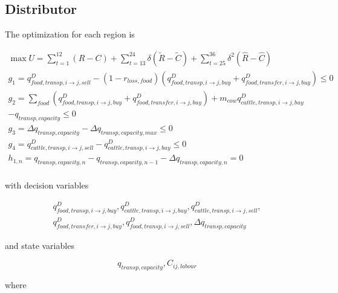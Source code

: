 \documentclass[letter,12pt]{article}
\begin{document}
\subsection{Distributor}

The optimization for each region is

\begin{gather}
\max U = \sum_{t=1}^{12} \left(R - C\right) + \sum_{t=13}^{24} \delta \left(\tilde{R} - \tilde{C}\right) + \sum_{t=25}^{36} \delta^2 \left(\hat{R} - \hat{C}\right) \\
g_1 = q_{food,transp,i \rightarrow j,sell}^D - \left(1 - r_{loss,food}\right) \left(q_{food,transp,i \rightarrow j,buy}^D + q_{food,transfer,i \rightarrow j,buy}^D \right) \leq 0 \\
g_2 = \sum_{food} \left( q_{food,transp,i \rightarrow j,buy}^D + q_{food,transfer,i \rightarrow j,buy}^D \right) + m_{cow} q_{cattle,transp,i \rightarrow j,buy}^D \nonumber \\ 
- q_{transp,capacity} \leq 0 \\
g_3 = \Delta q_{transp,capacity} - \Delta q_{transp,capacity,max} \leq 0 \\
g_4 = q_{cattle,transp,i \rightarrow j,sell}^D - q_{cattle,transp,i \rightarrow j,buy}^D \leq 0 \\
h_{1,n} = q_{transp,capacity,n} - q_{transp,capacity,n-1} - \Delta q_{transp,capacity,n} = 0 \\
\end{gather}

\noindent with decision variables

\begin{gather}
q_{food,transp,i \rightarrow j,buy}^D,q_{cattle,transp,i \rightarrow j,buy}^D,q_{cattle,transp,i \rightarrow j,sell}^D, \nonumber \\
q_{food,transfer,i \rightarrow j,buy}^D,q_{food,transp,i \rightarrow j,sell}^D,\Delta q_{transp,capacity} 
\end{gather}

\noindent and state variables

\begin{equation}
q_{transp,capacity}, C_{ij,labour}
\end{equation}

\noindent where
\end{document}
